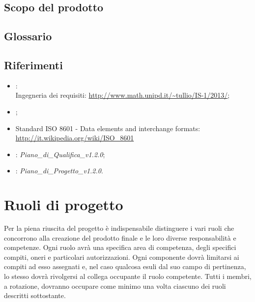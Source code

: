 \subsection{Scopo del prodotto}
\label{1.2}
\Prodotto{}

\subsection{Glossario}%
\label{1.3}
\Glossario{}

\subsection{Riferimenti} %
\label{1.4}

\begin{itemize}
\item {}:\\
Ingegneria dei requisiti: \url{http://www.math.unipd.it/~tullio/IS-1/2013/};
\item {};\\
\item Standard ISO 8601 - Data elements and interchange formats: \url{http://it.wikipedia.org/wiki/ISO_8601}
\item {}: \emph{Piano_di_Qualifica_v1.2.0};
\item {}: \emph{Piano_di_Progetto_v1.2.0}.
\end{itemize}

\newpage
\section{Ruoli di progetto}%
\label{2}
Per la piena riuscita del progetto è indispensabile distinguere i vari ruoli che concorrono alla creazione del prodotto finale e le loro diverse responsabilità e competenze.
Ogni ruolo avrà una specifica area di competenza, degli specifici compiti, oneri e particolari autorizzazioni. Ogni componente dovrà limitarsi ai compiti ad esso assegnati e, nel caso qualcosa esuli dal suo campo di pertinenza, lo stesso dovrà rivolgersi al collega occupante il ruolo competente.
Tutti i membri, a rotazione, dovranno occupare come minimo una volta ciascuno dei ruoli descritti sottostante.

